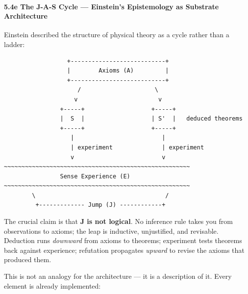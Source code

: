 \documentclass[
  11pt,
  a4paper,
]{article}
\begin{document}
\paragraph{5.4e The J-A-S Cycle --- Einstein's Epistemology as Substrate
Architecture}\label{e-the-j-a-s-cycle-einsteins-epistemology-as-substrate-architecture}

Einstein described the structure of physical theory as a cycle rather
than a ladder:

\begin{verbatim}
                  +---------------------------+
                  |        Axioms (A)         |
                  +---------------------------+
                     /                     \
                    v                       v
                +-----+                   +-----+
                |  S  |                   | S'  |   deduced theorems
                +-----+                   +-----+
                   |                         |
                   | experiment              | experiment
                   v                         v
~~~~~~~~~~~~~~~~~~~~~~~~~~~~~~~~~~~~~~~~~~~~~~~~~~~~~
                Sense Experience (E)
~~~~~~~~~~~~~~~~~~~~~~~~~~~~~~~~~~~~~~~~~~~~~~~~~~~~~
        \                                     /
         +------------- Jump (J) ------------+
\end{verbatim}

The crucial claim is that \textbf{J is not logical}. No inference rule
takes you from observations to axioms; the leap is inductive,
unjustified, and revisable. Deduction runs \emph{downward} from axioms
to theorems; experiment tests theorems back against experience;
refutation propagates \emph{upward} to revise the axioms that produced
them.

This is not an analogy for the architecture --- it is a description of
it. Every element is already implemented:
\end{document}
